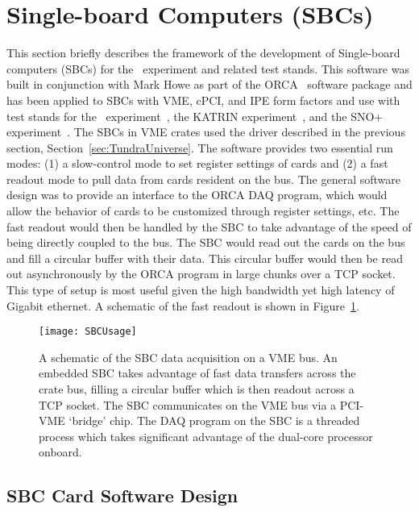 	\section{Single-board Computers (SBCs)}

	This section briefly describes the framework of the development of
Single-board computers (SBCs) for the \MJ~experiment and related test stands.
This software was built in conjunction with Mark Howe as part of the
ORCA~\cite{Howe08} software package and has been applied to SBCs with VME,
cPCI, and IPE form factors and use with test stands for the
\MJ~experiment~\cite{MJCollaboration}, the KATRIN
experiment~\cite{KatrinCollaboration}, and the SNO+
experiment~\cite{SNO+Collaboration}.  The SBCs in VME crates used the driver
described in the previous section, Section~\ref{sec:TundraUniverse}.  The
software provides two essential run modes: (1) a slow-control mode to set
register settings of cards and (2) a fast readout mode to pull data from cards
resident on the bus. The general software design was to provide an interface to
the ORCA DAQ program, which would allow the behavior of cards to be customized
through register settings, etc.  The fast readout would then be handled by the
SBC to take advantage of the speed of being directly coupled to the bus.  The
SBC would read out the cards on the bus and fill a circular buffer with their
data.  This circular buffer would then be read out asynchronously by the ORCA
program in large chunks over a TCP socket.  This type of setup is most useful
given the high bandwidth yet high latency of Gigabit ethernet.  A schematic of
the fast readout is shown in Figure~\ref{fig:SBCReadout}. 

		\begin{figure}
			\centering
			\texttt{[image: SBCUsage]}
			\caption[A schematic of the SBC data acquisition on a VME bus]
					{A schematic of the SBC data acquisition on a VME bus.  An embedded SBC takes
			         advantage of fast data transfers across the crate bus, filling
			         a circular buffer which is then readout across a TCP socket.
			         The SBC communicates on the VME bus via a PCI-VME `bridge' chip.  
			         The DAQ program on the SBC is a threaded process which takes
			         significant advantage of the dual-core processor onboard.} 
			\label{fig:SBCReadout}
		\end{figure}

		\subsection{SBC Card Software Design}	

